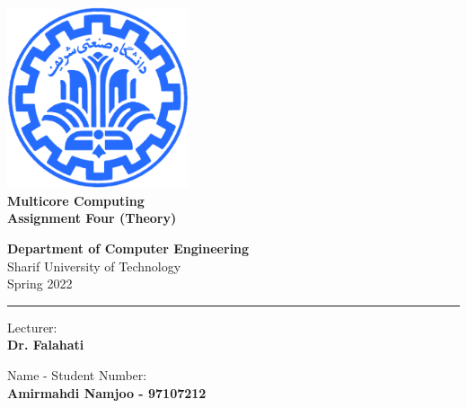 \documentclass[12pt]{article}
\begin{document}
	
	
\begin{titlepage}
	\begin{center}
		
		\vspace*{0.7cm}
		
		\includegraphics[width=0.4\textwidth]{sharif1.png}\\
		\vspace{0.5cm}
		\textbf{ \Huge{Multicore Computing} }\\
		\vspace{0.5cm}
		\textbf{ \Large{ Assignment Four (Theory)} }
		\vspace{0.2cm}
		
		
		\large \textbf{Department of Computer Engineering}\\\vspace{0.2cm}
		\large   Sharif University of Technology\\\vspace{0.2cm}
		\large   Spring 2022 \\\vspace{0.2cm}
		\noindent\rule[1ex]{\linewidth}{1pt}
		Lecturer:\\
		\textbf{{Dr. Falahati}}
		
		
		\vspace{0.15cm}
		Name - Student Number:\\
		
		
		\textbf{{Amirmahdi Namjoo - 97107212}}
	\end{center}
\end{titlepage}


\newpage
\pagestyle{fancy}
\fancyhf{}
\fancyfoot{}
\cfoot{\thepage}
\end{document}
